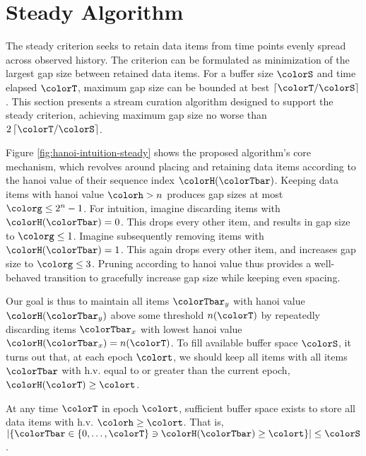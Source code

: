 \section{Steady Algorithm} \label{sec:steady}

The steady criterion seeks to retain data items from time points evenly spread across observed history.
The criterion can be formulated as minimization of the largest gap size between retained data items.
For a buffer size $\colorS$ and time elapsed $\colorT$, maximum gap size can be bounded at best $\left\lceil \colorT / \colorS \right\rceil$.
This section presents a stream curation algorithm designed to support the steady criterion, achieving maximum gap size no worse than $2\left\lceil \colorT / \colorS \right\rceil$.

Figure \ref{fig:hanoi-intuition-steady} shows the proposed algorithm's core mechanism, which revolves around placing and retaining data items according to the hanoi value of their sequence index $\colorH(\colorTbar)$.
Keeping data items with hanoi value $\colorh > n$ produces gap sizes at most $\colorg \leq 2^n - 1$.
For intuition, imagine discarding items with $\colorH(\colorTbar) = 0$.
This drops every other item, and results in gap size to $\colorg \leq 1$.
Imagine subsequently removing items with $\colorH(\colorTbar) = 1$.
This again drops every other item, and increases gap size to $\colorg \leq 3$.
Pruning according to hanoi value thus provides a well-behaved transition to gracefully increase gap size while keeping even spacing.

Our goal is thus to maintain all items $\colorTbar_y$ with hanoi value $\colorH(\colorTbar_y)$ above some threshold $n(\colorT)$ by repeatedly discarding items $\colorTbar_x$ with lowest hanoi value $\colorH(\colorTbar_x) = n(\colorT)$.
To fill available buffer space $\colorS$, it turns out that, at each epoch $\colort$, we should keep all items with all items $\colorTbar$ with h.v. equal to or greater than the current epoch, $\colorH(\colorT) \geq \colort$.

\begin{lemma}
At any time $\colorT$ in epoch $\colort$, sufficient buffer space exists to store all data items with h.v. $\colorh \geq \colort$.
That is, $\left| \{\colorTbar \in \{0, \ldots, \colorT \} \ni \colorH(\colorTbar) \geq \colort \} \right| \leq \colorS$.
\end{lemma}

